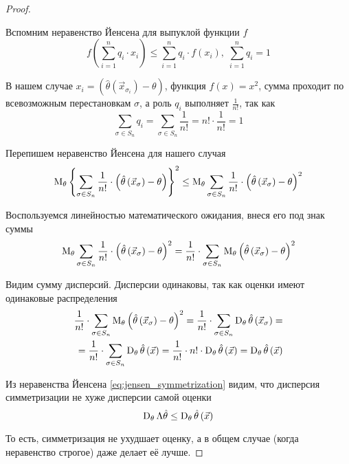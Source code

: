 \begin{proof}
\begin{enumerate}
      Вспомним неравенство Йенсена для выпуклой функции $f$
      \cite[с.~167]{DorogovtsevMA}
      $$f\left(\sum_{i=1}^n q_i\cdot x_i\right)
          \le \sum_{i=1}^n q_i\cdot f\left(x_i\right),\;
        \sum_{i=1}^n q_i=1$$

      В нашем случае
      $x_i= \left(\hat{\theta}
          \left(\vec{x}_{\sigma_i}\right)-\theta\right)$,
      функция $f\left(x\right)=x^2$,
      сумма проходит по всевозможным перестановкам $\sigma$,
      а роль $q_i$ выполняет $\frac{1}{n!}$,
      так как
          $$\sum_{\sigma\in S_n} q_i
        = \sum_{\sigma\in S_n}\frac{1}{n!}=n!\cdot\frac{1}{n!}=1$$

      Перепишем неравенство Йенсена для нашего случая
      \begin{equation}\label{eq:jensen_symmetrization}
          \operatorname{M}_{\theta} \left\{\sum_{\sigma\in S_n}\frac{1}{n!}\cdot
        \left(\hat{\theta}\left(\vec{x}_\sigma\right)
        -\theta\right)\right\}^2
        \le\operatorname{M}_{\theta} \sum_{\sigma\in S_n}\frac{1}{n!}\cdot
            \left(\hat{\theta}\left(\vec{x}_\sigma\right)
            -\theta\right)^2
      \end{equation}

      Воспользуемся линейностью математического ожидания,
      внеся его под знак суммы
      \begin{align*}
          \operatorname{M}_{\theta} \sum_{\sigma\in S_n}\frac{1}{n!}\cdot
        \left(\hat{\theta}\left(\vec{x}_\sigma\right)
        -\theta\right)^2
          = \frac{1}{n!}\cdot\sum_{\sigma\in S_n}
        \operatorname{M}_{\theta} 
            \left(\hat{\theta}\left(\vec{x}_\sigma\right)
            -\theta\right)^2
      \end{align*}

      Видим сумму дисперсий.
      Дисперсии одинаковы, так как оценки имеют одинаковые распределения
      \begin{align*}
          \frac{1}{n!}\cdot\sum_{\sigma\in S_n}
        \operatorname{M}_{\theta} 
            \left(\hat{\theta}\left(\vec{x}_\sigma\right)
            -\theta\right)^2
          = \frac{1}{n!}\cdot\sum_{\sigma\in S_n}
        \operatorname{D}_{\theta} 
            \hat{\theta}\left(\vec{x}_\sigma\right)= \\
          = \frac{1}{n!}\cdot\sum_{\sigma\in S_n}
        \operatorname{D}_{\theta} \hat{\theta}\left(\vec{x}\right)
          = \frac{1}{n!}\cdot n!
        \cdot\operatorname{D}_{\theta} \hat{\theta}\left(\vec{x}\right)
          = \operatorname{D}_{\theta} \hat{\theta}\left(\vec{x}\right)
      \end{align*}

      Из неравенства Йенсена \eqref{eq:jensen_symmetrization} видим,
      что дисперсия симметризации не хуже дисперсии самой оценки
      $$\operatorname{D}_{\theta} \Lambda\hat{\theta}
          \le\operatorname{D}_{\theta} \hat{\theta}\left({\vec{x}}\right)$$

  \end{enumerate}

  То есть, симметризация не ухудшает оценку,
  а в общем случае (когда неравенство строгое) даже делает её лучше.
\end{proof}

